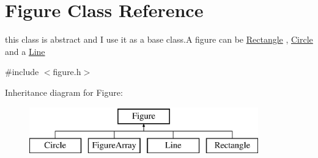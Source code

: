 \hypertarget{class_figure}{}\section{Figure Class Reference}
\label{class_figure}


this class is abstract and I use it as a base class.\+A figure can be \mbox{\hyperlink{class_rectangle}{Rectangle}} , \mbox{\hyperlink{class_circle}{Circle}} and a \mbox{\hyperlink{class_line}{Line}}  




{\ttfamily \#include $<$figure.\+h$>$}

Inheritance diagram for Figure\+:\begin{figure}[H]
\begin{center}
\leavevmode
\includegraphics[height=2.000000cm]{class_figure}
\end{center}
\end{figure}
